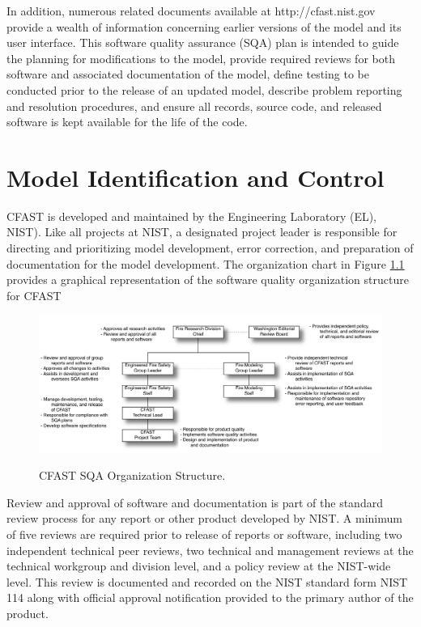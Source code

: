 \documentclass[12pt]{book}
\begin{document}
In addition, numerous related documents available at http://cfast.nist.gov provide a wealth of information concerning earlier versions of the model and its user interface. This software quality assurance (SQA) plan is intended to guide the planning for modifications to the model, provide required reviews for both software and associated documentation of the model, define testing to be conducted prior to the release of an updated model, describe problem reporting and resolution procedures, and ensure all records, source code, and released software is kept available for the life of the code.

\chapter{Model Identification and Control}

CFAST is developed and maintained by the Engineering Laboratory (EL), NIST). Like all projects at NIST, a designated project leader is responsible for directing and prioritizing model development, error correction, and preparation of documentation for the model development.  The organization chart in Figure \ref{figOrgChart} provides a graphical representation of the software quality organization structure for CFAST

\begin{figure}
\begin{center}
\includegraphics[width=6.5in]{FIGURES/OrgChart.pdf}\\
\end{center}
\caption{CFAST SQA Organization Structure.}
 \label{figOrgChart}
\end{figure}

Review and approval of software and documentation is part of the standard review process for any report or other product developed by NIST. A minimum of five reviews are required prior to release of reports or software, including two independent technical peer reviews, two technical and management reviews at the technical workgroup and division level, and a policy review at the NIST-wide level.  This review is documented and recorded on the NIST standard form NIST 114 along with official approval notification provided to the primary author of the product.
\end{document}
